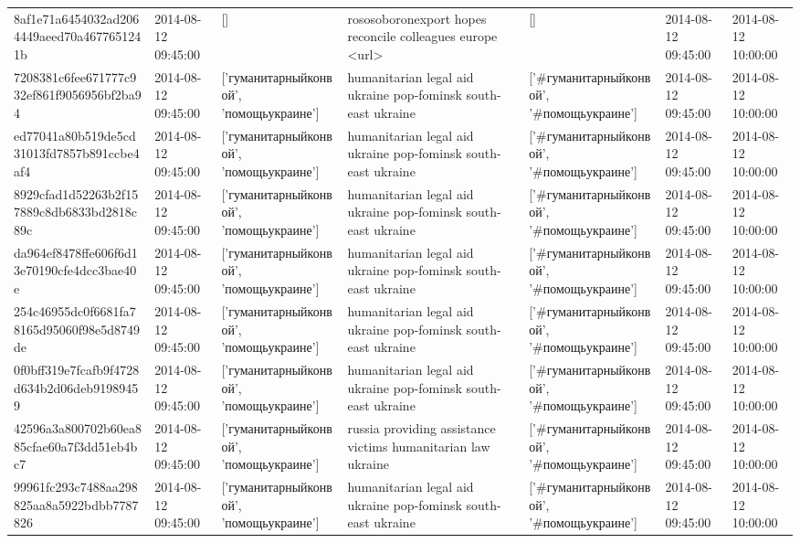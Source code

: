 \begin{tabular}{lllllll}
8af1e71a6454032ad2064449aeed70a4677651241b & 2014-08-12 09:45:00 & [] & rososoboronexport hopes reconcile colleagues europe <url> & [] & 2014-08-12 09:45:00 & 2014-08-12 10:00:00 \\
7208381c6fee671777c932ef861f9056956bf2ba94 & 2014-08-12 09:45:00 & ['гуманитарныйконвой', 'помощьукраине'] & humanitarian legal aid ukraine pop-fominsk south-east ukraine & ['#гуманитарныйконвой', '#помощьукраине'] & 2014-08-12 09:45:00 & 2014-08-12 10:00:00 \\
ed77041a80b519de5cd31013fd7857b891ccbe4af4 & 2014-08-12 09:45:00 & ['гуманитарныйконвой', 'помощьукраине'] & humanitarian legal aid ukraine pop-fominsk south-east ukraine & ['#гуманитарныйконвой', '#помощьукраине'] & 2014-08-12 09:45:00 & 2014-08-12 10:00:00 \\
8929cfad1d52263b2f157889c8db6833bd2818c89c & 2014-08-12 09:45:00 & ['гуманитарныйконвой', 'помощьукраине'] & humanitarian legal aid ukraine pop-fominsk south-east ukraine & ['#гуманитарныйконвой', '#помощьукраине'] & 2014-08-12 09:45:00 & 2014-08-12 10:00:00 \\
da964ef8478ffe606f6d13e70190cfe4dcc3bae40e & 2014-08-12 09:45:00 & ['гуманитарныйконвой', 'помощьукраине'] & humanitarian legal aid ukraine pop-fominsk south-east ukraine & ['#гуманитарныйконвой', '#помощьукраине'] & 2014-08-12 09:45:00 & 2014-08-12 10:00:00 \\
254c46955dc0f6681fa78165d95060f98e5d8749de & 2014-08-12 09:45:00 & ['гуманитарныйконвой', 'помощьукраине'] & humanitarian legal aid ukraine pop-fominsk south-east ukraine & ['#гуманитарныйконвой', '#помощьукраине'] & 2014-08-12 09:45:00 & 2014-08-12 10:00:00 \\
0f0bff319e7fcafb9f4728d634b2d06deb91989459 & 2014-08-12 09:45:00 & ['гуманитарныйконвой', 'помощьукраине'] & humanitarian legal aid ukraine pop-fominsk south-east ukraine & ['#гуманитарныйконвой', '#помощьукраине'] & 2014-08-12 09:45:00 & 2014-08-12 10:00:00 \\
42596a3a800702b60ea885cfae60a7f3dd51eb4bc7 & 2014-08-12 09:45:00 & ['гуманитарныйконвой', 'помощьукраине'] & russia providing assistance victims humanitarian law ukraine & ['#гуманитарныйконвой', '#помощьукраине'] & 2014-08-12 09:45:00 & 2014-08-12 10:00:00 \\
99961fc293c7488aa298825aa8a5922bdbb7787826 & 2014-08-12 09:45:00 & ['гуманитарныйконвой', 'помощьукраине'] & humanitarian legal aid ukraine pop-fominsk south-east ukraine & ['#гуманитарныйконвой', '#помощьукраине'] & 2014-08-12 09:45:00 & 2014-08-12 10:00:00 \\

\end{tabular}
